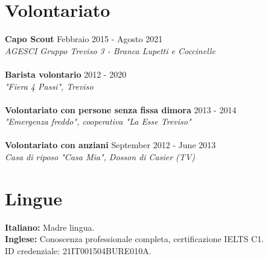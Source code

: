 \documentclass[margin, 10pt]{res}
\begin{document}
\begin{resume}
\section{Volontariato}

\textbf{Capo Scout} \hfill Febbraio 2015 - Agosto 2021 \\
\textit{AGESCI Gruppo Treviso 3 - Branca Lupetti e Coccinelle} \\ \\
\textbf{Barista volontario} \hfill 2012 - 2020 \\
\textit{"Fiera 4 Passi", Treviso} \\ \\
\textbf{Volontariato con persone senza fissa dimora} \hfill 2013 - 2014 \\
\textit{"Emergenza freddo", cooperativa "La Esse Treviso"} \\ \\
\textbf{Volontariato con anziani} \hfill September 2012 - June 2013 \\
\textit{Casa di riposo "Casa Mia", Dosson di Casier (TV)} 





\section{Lingue}
\textbf{Italiano: } Madre lingua. \\
\textbf{Inglese: } Conoscenza professionale completa, certificazione IELTS C1.\\ID credenziale: 21IT001504BURE010A.\\

\end{resume}
\end{document}
